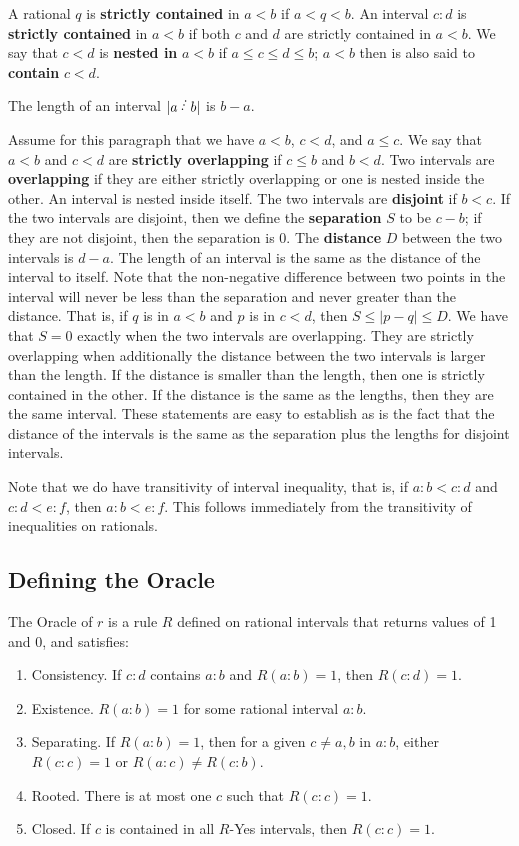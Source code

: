 \documentclass[12pt]{article}
\begin{document}
A rational $q$ is \textbf{strictly contained} in $a\lt b$ if $a < q < b$. An interval $c:d$ is \textbf{strictly contained} in $a\lt b$ if both $c$ and $d$ are strictly contained in $a \lt b$. We say that $c \lt d$ is \textbf{nested in} $a\lt b$ if $a \leq c \leq d \leq b$; $a \lt b$ then is also said to \textbf{contain} $c \lt d$. 

The length of an interval $|a \lte b |$ is $b-a$. 

Assume for this paragraph that we have $a \lt b$, $c \lt d$, and $a \leq c$. We say that $a\lt b$ and $c \lt d$ are \textbf{strictly overlapping} if $c \leq b$ and $b < d$. Two intervals are \textbf{overlapping} if they are either strictly overlapping or one is nested inside the other. An interval is nested inside itself. The two intervals are \textbf{disjoint} if $b < c$. If the two intervals are disjoint, then we define the \textbf{separation} $S$ to be $c-b$; if they are not disjoint, then the separation is 0.  The \textbf{distance} $D$ between the two intervals is $d-a$. The length of an interval is the same as the distance of the interval to itself. Note that the non-negative difference between two points in the interval will never be less than the separation and never greater than the distance. That is, if $q$ is in $a\lt b$ and $p$ is in $c \lt d$, then $S \leq |p-q| \leq D$. We have that  $S = 0$ exactly when the two intervals are overlapping. They are strictly overlapping when additionally the distance between the two intervals is larger than the length. If the distance is smaller than the length, then one is strictly contained in the other. If the distance is the same as the lengths, then they are the same interval. These statements are easy to establish as is the fact that the distance of the intervals is the same as the separation plus the lengths for disjoint intervals. 

Note that we do have transitivity of interval inequality, that is, if $a:b < c:d$ and $c:d < e:f$, then $a:b < e:f$. This follows immediately from the transitivity of inequalities on rationals.



\subsection{Defining the Oracle}

The Oracle of $r$ is a rule $R$ defined on rational intervals that returns values of 1 and 0, and satisfies: 
\begin{enumerate}
    \item Consistency. If $c:d$ contains $a:b$ and $R(a:b) = 1$, then $R(c:d) = 1$.
    \item Existence. $R(a:b) = 1$ for some rational interval $a:b$.
    \item Separating. If $R(a:b)=1$, then for a given $c \neq a, b$ in $a:b$, either $R(c:c) = 1$ or $R(a:c) \neq R(c:b)$. 
    \item Rooted. There is at most one $c$ such that $R(c:c) =1$.
    \item Closed. If $c$ is contained in all $R$-Yes intervals, then $R(c:c) = 1$.
\end{enumerate}
\end{document}
